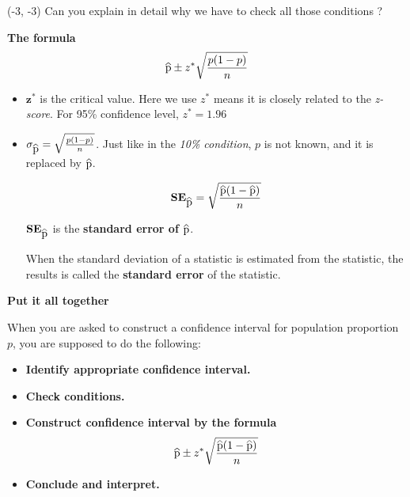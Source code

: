 \documentclass[a4paper, 12pt,twoside]{book}
\newcommand\reallywidehat[1]{%
\savestack{\tmpbox}{\stretchto{%
  \scaleto{%
    \scalerel*[\widthof{\ensuremath{#1}}]{\kern-.6pt\bigwedge\kern-.6pt}%
    {\rule[-\textheight/2]{1ex}{\textheight}}%
  }{\textheight}%
}{0.5ex}}%
\stackon[1pt]{#1}{\tmpbox}%
}
\begin{document}
\begin{itemize}
\begin{itemize}[leftmargin = 0.5cm]
   \end{itemize}
   
   \begin{textblock}{3.6}(-3, -3)  
   Can you explain in detail why we have to check all those conditions ?
   \end{textblock}
   \vspace{0.6cm}

 \item\textbf{The formula}\vspace{0.3cm}
    $$\reallywidehat{p} \pm z^* \sqrt{\frac{p(1-p)}{n}}$$
    
    \begin{itemize}
        \item $\mathbf{z^*}$ is the critical value. Here we use $z^*$ means it is closely related to the \textit{z-score}. For 95\% confidence level, $z^* = 1.96$
        \item $\sigma_{\reallywidehat{p}}= \sqrt{\frac{p(1-p)}{n}}$. \hspace{0.3cm} Just like in the \textit{10\% condition},  $p$ is not known, and it is replaced by $\reallywidehat{p}$.
        
        
        $$\textbf{SE}_{\reallywidehat{p}} = \sqrt{\frac{\reallywidehat{p}(1-\reallywidehat{p})}{n}}$$
        
        $\textbf{SE}_{\reallywidehat{p}}$ is the \textbf{standard error of $\reallywidehat{p}$}. \vspace{0.3cm}
        
        When the standard deviation of a statistic is estimated from the statistic, the results is called the \textbf{standard error} of the statistic.
        
    \end{itemize}
    
    
\colorbox{babypink}{\parbox{\textwidth}{
\item \textbf{Put it all together}\vspace{0.3cm}

When you are asked to construct a confidence interval for population proportion $p$, you are supposed to do the following:

    \begin{itemize}
       \item \textbf{Identify appropriate confidence interval.}
       \item \textbf{Check conditions.}
       \item \textbf{Construct confidence interval by the formula}
       $$\reallywidehat{p} \pm z^* \sqrt{\frac{\reallywidehat{p}(1-\reallywidehat{p})}{n}}$$
       \item \textbf{Conclude and interpret.}
    \end{itemize}
    \vspace{0.6cm}
}}


\end{itemize}
\end{document}
